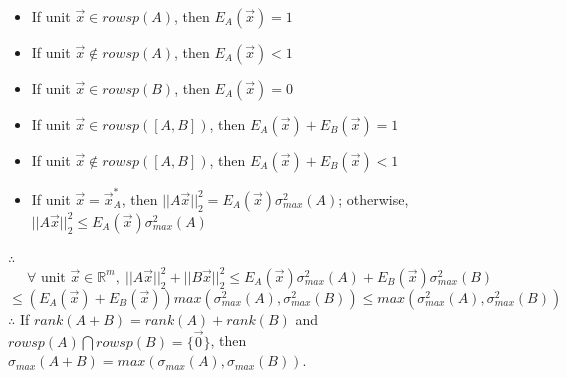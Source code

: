 \documentclass[letterpaper,11pt]{article}
\begin{document}
\begin{enumerate}
\begin{itemize}
\item If unit $\vec{x} \in rowsp(A)$, then $E_A(\vec{x})=1$
\item If unit $\vec{x} \not \in rowsp(A)$, then $E_A(\vec{x})<1$
\item If unit $\vec{x} \in rowsp(B)$, then $E_A(\vec{x})=0$
\item If unit $\vec{x} \in rowsp([A,B])$, then $E_A(\vec{x})+E_B(\vec{x})=1$
\item If unit $\vec{x} \not \in rowsp([A,B])$, then $E_A(\vec{x})+E_B(\vec{x})<1$
\item If unit $\vec{x} = \vec{x}_A^*$, then $||A\vec{x}||_2^2=E_A(\vec{x})\sigma_{max}^2(A)$; otherwise, $||A\vec{x}||_2^2 \leq E_A(\vec{x})\sigma_{max}^2(A)$
\end{itemize}
$\therefore$ 
$$\forall \text{ unit }\vec{x} \in \mathbb{R}^{m},~||A\vec{x}||_2^2 + ||B\vec{x}||_2^2 \leq E_A(\vec{x})\sigma_{max}^2(A)+E_B(\vec{x})\sigma_{max}^2(B)$$
$$\leq (E_A(\vec{x})+E_B(\vec{x})) max(\sigma_{max}^2(A),\sigma_{max}^2(B)) \leq max(\sigma_{max}^2(A),\sigma_{max}^2(B))$$
$\therefore$ If $rank(A+B)=rank(A)+rank(B)$ and $rowsp(A) \bigcap rowsp(B) = \{\vec{0}\}$, then $\sigma_{max}(A+B) = max (\sigma_{max} (A), \sigma_{max}(B))$.


\end{enumerate}
\end{document}
